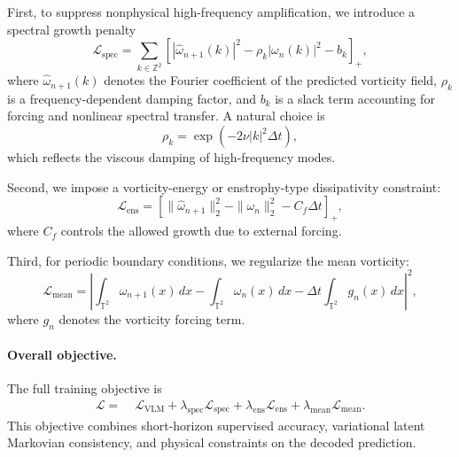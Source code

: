 \documentclass[11pt]{article}
\begin{document}
First, to suppress nonphysical high-frequency amplification, we introduce a spectral growth penalty
\begin{equation}
    \mathcal L_{\mathrm{spec}}
    =
    \sum_{k\in\mathbb Z^2}
    \left[
        |\widehat{\omega}_{n+1}(k)|^2
        -
        \rho_k |\omega_n(k)|^2
        -
        b_k
    \right]_+,
\end{equation}
where $\widehat{\omega}_{n+1}(k)$ denotes the Fourier coefficient of the predicted vorticity field, $\rho_k$ is a frequency-dependent damping factor, and $b_k$ is a slack term accounting for forcing and nonlinear spectral transfer. A natural choice is
\begin{equation}
    \rho_k = \exp(-2\nu |k|^2\Delta t),
\end{equation}
which reflects the viscous damping of high-frequency modes.

Second, we impose a vorticity-energy or enstrophy-type dissipativity constraint:
\begin{equation}
    \mathcal L_{\mathrm{ens}}
    =
    \left[
        \|\widehat{\omega}_{n+1}\|_2^2
        -
        \|\omega_n\|_2^2
        -
        C_f\Delta t
    \right]_+,
\end{equation}
where $C_f$ controls the allowed growth due to external forcing.

Third, for periodic boundary conditions, we regularize the mean vorticity:
\begin{equation}
    \mathcal L_{\mathrm{mean}}
    =
    \left|
        \int_{\mathbb T^2}
        \widehat{\omega}_{n+1}(x)\,dx
        -
        \int_{\mathbb T^2}
        \omega_n(x)\,dx
        -
        \Delta t
        \int_{\mathbb T^2}
        g_n(x)\,dx
    \right|^2,
\end{equation}
where $g_n$ denotes the vorticity forcing term.

\paragraph{Overall objective.}
The full training objective is
\begin{equation}
\begin{aligned}
    \mathcal L
    =
    &\;
    \mathcal L_{\mathrm{VLM}}
    +
    \lambda_{\mathrm{spec}}
    \mathcal L_{\mathrm{spec}}
    +
    \lambda_{\mathrm{ens}}
    \mathcal L_{\mathrm{ens}}
    +
    \lambda_{\mathrm{mean}}
    \mathcal L_{\mathrm{mean}} .
\end{aligned}
\end{equation}
This objective combines short-horizon supervised accuracy, variational latent Markovian consistency, and physical constraints on the decoded prediction.
\end{document}
